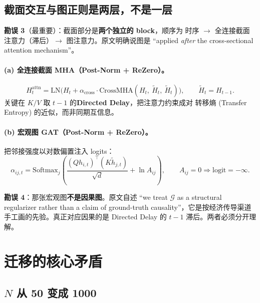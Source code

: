 \documentclass[11pt, a4paper]{ctexart}
\begin{document}
\subsection{截面交互与图正则是两层，不是一层}

\begin{warnbox}
\textbf{勘误 3}（最重要）：截面部分是\textbf{两个独立的 block}，顺序为
时序 $\to$ 全连接截面注意力（滞后）$\to$ 图注意力。原文明确说图是
“applied \emph{after} the cross-sectional attention mechanism”。
\end{warnbox}

\paragraph{(a) 全连接截面 MHA（Post-Norm + ReZero）。}
\begin{equation}
H^{\text{attn}}_t = \mathrm{LN}\bigl(H_t + \alpha_{\text{cross}}\cdot
\mathrm{CrossMHA}(H_t,\ \tilde{H}_t,\ \tilde{H}_t)\bigr),
\qquad \tilde{H}_t = H_{t-1}.
\end{equation}
关键在 $K/V$ 取 $t-1$ 的\textbf{Directed Delay}，把注意力约束成对
转移熵 (Transfer Entropy) 的近似，而非同期互信息。

\paragraph{(b) 宏观图 GAT（Post-Norm + ReZero）。}把邻接强度以对数偏置注入 logits：
\begin{equation}
\alpha_{ij,t} = \mathrm{Softmax}_j\left(
\frac{(Q h_{i,t})^{\top}(K \tilde{h}_{j,t})}{\sqrt{d}} + \ln A_{ij}\right),
\qquad A_{ij}=0 \Rightarrow \text{logit} = -\infty .
\end{equation}

\begin{warnbox}
\textbf{勘误 4}：那张宏观图\textbf{不是因果图}。原文自述
“we treat $\mathcal{G}$ as a structural regularizer rather than a claim of
ground-truth causality”，它是按经济传导渠道手工画的先验。真正对应因果的是
Directed Delay 的 $t-1$ 滞后。两者必须分开理解。
\end{warnbox}

\section{迁移的核心矛盾}

\subsection{$N$ 从 50 变成 1000}
\end{document}
